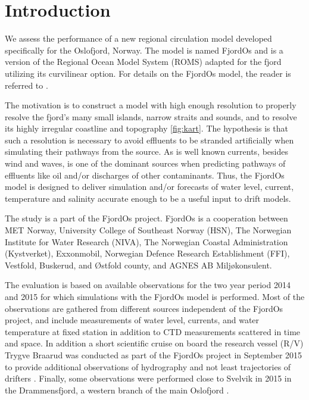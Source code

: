 
\section{Introduction}

We assess the performance of a new regional circulation model developed specifically for the Oslofjord, Norway. The model is named FjordOs and is a version of the Regional Ocean Model System (ROMS) adapted for the fjord utilizing its curvilinear option. For details on the FjordOs model, the reader is referred to \cite{roed:etal:2016}. 

The motivation is to construct a model with high enough resolution to properly resolve the fjord's many small islands, narrow straits and sounds, and to resolve its highly irregular coastline and topography \ref{fig:kart}. The hypothesis is that such a resolution is necessary to avoid effluents to be stranded artificially when simulating their pathways from the source. As is well known currents, besides wind and waves, is one of the dominant sources when predicting pathways of effluents like oil and/or discharges of other contaminants. Thus, the FjordOs model is designed to deliver simulation and/or forecasts of water level, current, temperature and salinity accurate enough to be a useful input to drift models.

The study is a part of the FjordOs project. FjordOs is a cooperation between MET Norway, University College of Southeast Norway (HSN), The Norwegian Institute for Water Research (NIVA), The Norwegian Coastal Administration (Kystverket), Exxonmobil, Norwegian Defence Research Establishment (FFI), Vestfold, Buskerud, and {\O}stfold county, and AGNES AB Milj{\o}konsulent.

The evaluation is based on available observations for the two year period 2014 and 2015 for which simulations with the FjordOs model is performed. Most of the observations are gathered from different sources independent of the FjordOs project, and include measurements of water level, currents, and water temperature at fixed station in addition to CTD measurements scattered in time and space. In addition a short scientific cruise on board the research vessel (R/V) Trygve Braarud was conducted as part of the FjordOs project in September 2015 to provide additional observations of hydrography and not least trajectories of drifters \citep{hjelm:etal:2016}. Finally, some observations were performed close to Svelvik in 2015 in the Drammensfjord, a western branch of the main Oslofjord \citep{staalstrom:2017}.

